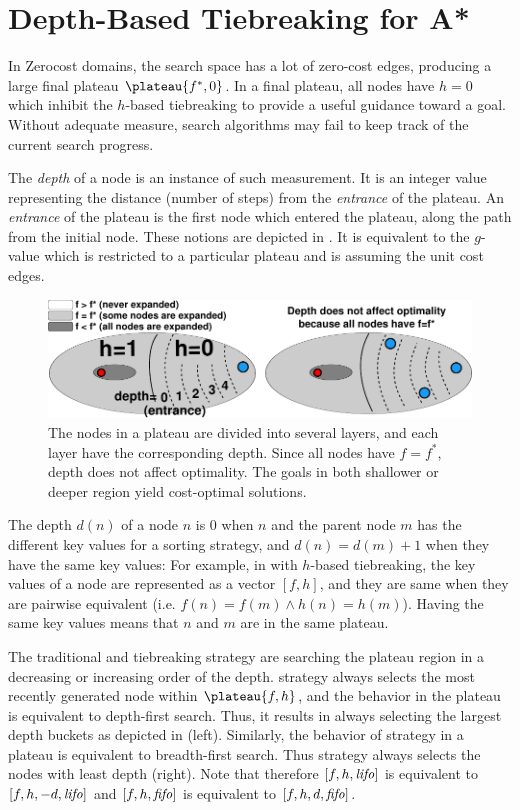\section{Depth-Based Tiebreaking for A*}

\label{sec:depth}

In Zerocost domains, the search space has a lot of zero-cost edges,
producing a large final plateau $\plateau{f^*,0}$. In a final plateau,
all nodes have $h=0$ which inhibit the $h$-based tiebreaking to provide
a useful guidance toward a goal. Without adequate measure, search
algorithms may fail to keep track of the current search progress.

The \emph{depth} of a node is an instance of such measurement.  It is an
integer value representing the distance (number of steps) from the
\emph{entrance} of the plateau.  An \emph{entrance} of the plateau is
the first node which entered the plateau, along the path from the
initial node. These notions are depicted in
. It is equivalent to the $g$-value which is
restricted to a particular plateau and is assuming the unit cost edges.

\begin{figure}[htbp]
  \centering
  \includegraphics{img/astar/plateau-2.pdf}
 \caption{The nodes in a plateau are divided into several layers, and each layer have the corresponding depth. Since all nodes have $f=f^*$, depth does not affect optimality. The goals in both shallower or deeper region yield cost-optimal solutions.
 }
 \label{fig:plateau-depiction}
\end{figure}

The depth $d(n)$ of a
node $n$ is 0 when $n$ and the parent node $m$ has the different key
values for a sorting strategy, and $d(n)=d(m)+1$ when they have the same
key values: For example, in \astar with $h$-based tiebreaking, the key
values of a node are represented as a vector $[f,h]$, and they are same
when they are pairwise equivalent (i.e. $f(n) = f(m) \land h(n) =
h(m)$).  Having the same key values means that $n$ and $m$ are in the
same plateau. 

The traditional \lifo and \fifo tiebreaking strategy are
searching the plateau region in a decreasing or increasing order of the depth.
\lifo strategy always selects the most recently generated node
within $\plateau{f,h}$, and the behavior in the plateau is equivalent to depth-first search.
Thus, it results in always selecting the largest depth
buckets as depicted in  (left).
Similarly, the behavior of \fifo strategy 
in a plateau is equivalent to breadth-first search. Thus \fifo strategy
always selects the nodes with least depth (right).
Note that therefore $[f,h,{\text{\textit{lifo}}}]$ is equivalent to $[f,h,-d,{\text{\textit{lifo}}}]$ and
$[f,h,{\text{\textit{fifo}}}]$ is equivalent to $[f,h,d,{\text{\textit{fifo}}}]$.

